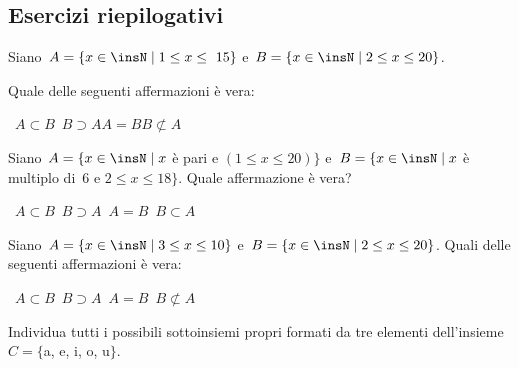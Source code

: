 \subsection{Esercizi riepilogativi}

\begin{esercizio}[\Ast]
\label{ese:5.92}
Siano~$A=\{x\in\insN\mid 1\le x\le~15\}$ e~$B=\{x\in\insN\mid 2\le x\le 20\}$.
\begin{center}

\end{center}
Quale delle seguenti affermazioni è vera:
\begin{center}
\boxA\quad~$A\subset B$\quad\boxB\quad~$B\supset A$\quad\boxC\quad$A=B$\quad\boxD\quad$B\not\subset A$
\end{center}
\end{esercizio}

\begin{esercizio}
\label{ese:5.93}
 Siano~$A=\{x\in\insN\mid x$ è pari e $(1\le x\le 20)\}$ e~$B=\{x\in\insN\mid x$ è multiplo di~6 e $2\le x\le 18\}$.
Quale affermazione è vera?
\begin{center}
 \boxA\quad~$A\subset B$\quad\boxB\quad~$B\supset A$\quad\boxC\quad~$A=B$\quad\boxD\quad~$B\subset A$
\end{center}
\end{esercizio}

\begin{esercizio}
\label{ese:5.94}
Siano~$A=\{x\in\insN\mid 3\le x\le 10\}$ e~$B=\{x\in\insN\mid 2\le x\le 20\}$.
Quali delle seguenti affermazioni è vera:
\begin{center}
 \boxA\quad~$A\subset B$\quad\boxB\quad~$B\supset A$\quad\boxC\quad~$A=B$\quad\boxD\quad~$B\not\subset A$
\end{center}
\end{esercizio}

\begin{esercizio}
\label{ese:5.95}
Individua tutti i possibili sottoinsiemi propri formati da tre elementi dell'insieme~$C=\{$a, e, i, o, u$\}$.
\end{esercizio}


